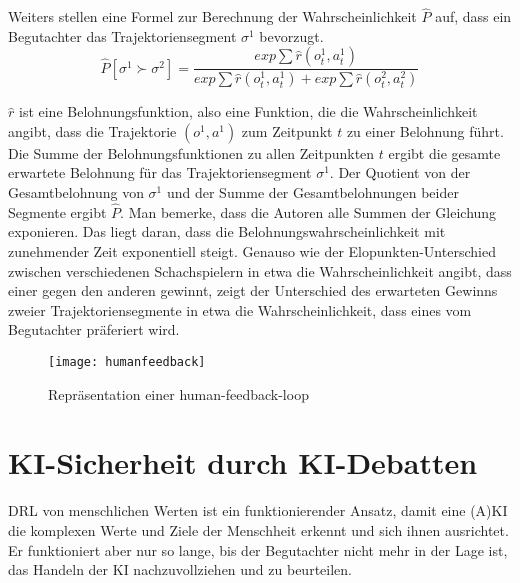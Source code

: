 Weiters stellen \citeauthor{christiano_deep_2017} eine Formel zur Berechnung der Wahrscheinlichkeit $\hat{P}$ auf, dass ein Begutachter das Trajektoriensegment $\sigma^1$ bevorzugt.
\begin{equation}
  \hat{P}[\sigma^1 \succ \sigma^2] = \frac{exp \sum \hat{r} (o_t^1,a_t^1)}{exp \sum \hat{r}(o^1_t,a^1_t) + exp \sum \hat{r}(o^2_t, a^2_t)}
\end{equation}

$\hat{r}$ ist eine Belohnungsfunktion, also eine Funktion, die die Wahrscheinlichkeit angibt, dass die Trajektorie $(o^1,a^1)$ zum Zeitpunkt $t$ zu einer Belohnung führt. Die Summe der Belohnungsfunktionen zu allen Zeitpunkten $t$ ergibt die gesamte erwartete Belohnung für das Trajektoriensegment $\sigma^1$. Der Quotient von der Gesamtbelohnung von $\sigma^1$ und der Summe der Gesamtbelohnungen beider Segmente ergibt $\hat{P}$. Man bemerke, dass die Autoren alle Summen der Gleichung exponieren. Das liegt daran, dass die Belohnungswahrscheinlichkeit mit zunehmender Zeit exponentiell steigt. Genauso wie der Elopunkten-Unterschied zwischen verschiedenen Schachspielern in etwa die Wahrscheinlichkeit angibt, dass einer gegen den anderen gewinnt, zeigt der Unterschied des erwarteten Gewinns zweier Trajektoriensegmente in etwa die Wahrscheinlichkeit, dass eines vom Begutachter präferiert wird.

\begin{figure}
  \texttt{[image: humanfeedback]}
  \caption{Repräsentation einer human-feedback-loop }
  \label{humanfeedbackimg}
\end{figure}

\section{KI-Sicherheit durch KI-Debatten}
DRL von menschlichen Werten ist ein funktionierender Ansatz, damit eine (A)KI die komplexen Werte und Ziele der Menschheit erkennt und sich ihnen ausrichtet. Er funktioniert aber nur so lange, bis der Begutachter nicht mehr in der Lage ist, das Handeln der KI nachzuvollziehen und zu beurteilen. 



